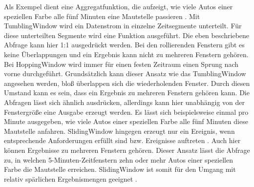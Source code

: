 Als Exempel dient eine Aggregatfunktion, die aufzeigt, wie viele Autos einer speziellen Farbe alle fünf Minuten eine Mautstelle passieren \cite{Prosise.}. Mit TumblingWindow wird ein Datenstrom in einzelne Zeitsegmente unterteilt. Für diese unterteilten Segmente wird eine Funktion ausgeführt. Die eben beschriebene Abfrage kann hier 1:1 ausgedrückt werden. Bei den rollierenden Fenstern gibt es keine Überlappungen und ein Ergebnis kann nicht zu mehreren Fenstern gehören. Bei HoppingWindow wird immer für einen festen Zeitraum einen Sprung nach vorne durchgeführt. Grundsätzlich kann dieser Ansatz wie das TumblingWindow angesehen werden, bloß überlappen sich die wiederholenden Fenster. Durch diesen Umstand kann es sein, dass ein Ergebnis zu mehreren Fenstern gehören kann. Die Abfragen lässt sich ähnlich ausdrücken, allerdings kann hier unabhängig von der Fenstergröße eine Ausgabe erzeugt werden. Es lässt sich beispielsweise einmal pro Minute ausgegeben, wie viele Autos einer speziellen Farbe alle fünf Minuten diese Mautstelle anfahren. SlidingWindow hingegen erzeugt nur ein Ereignis, wenn entsprechende Anforderungen erfüllt sind bzw. Ereignisse auftreten \cite{Azure.2017}. Auch hier können Ergebnisse zu mehreren Fenstern gehören. Dieser Ansatz lässt die Abfrage zu, in welchen 5-Minuten-Zeitfenstern zehn oder mehr Autos einer speziellen Farbe die Mautstelle erreichen. SlidingWindow ist somit für den Umgang mit relativ spärlichen Ergebnismengen geeignet \cite{Prosise.}.

 